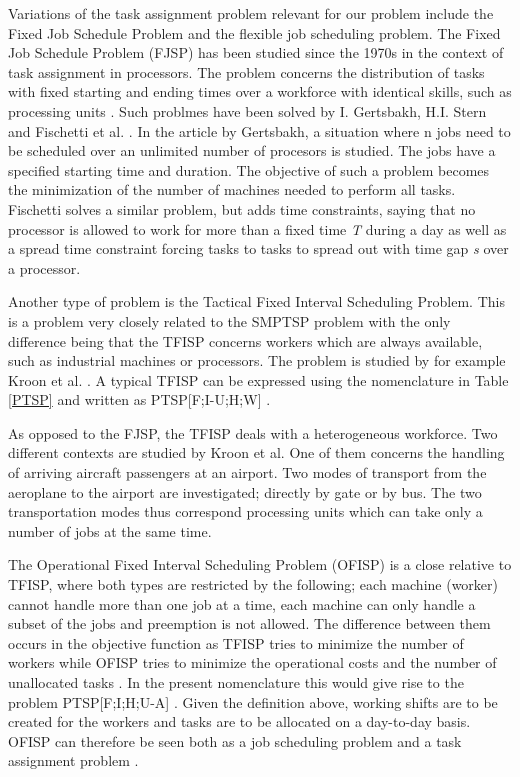 Variations of the task assignment problem relevant for our problem include the Fixed Job Schedule Problem and the flexible job scheduling problem. The Fixed Job Schedule Problem (FJSP) has been studied since the 1970s in the context of task assignment in processors. The problem concerns the distribution of tasks with fixed starting and ending times over a workforce with identical skills, such as processing units \cite{krishnamoorthy_2011}. Such problmes have been solved by I. Gertsbakh, H.I. Stern \cite{Gertsbakh_1977} and Fischetti et al. \cite{fischetti_1992}. In the article by Gertsbakh, a situation where n jobs need to be scheduled over an unlimited number of procesors is studied. The jobs have a specified starting time and duration. The objective of such a problem becomes the minimization of the number of machines needed to perform all tasks. Fischetti solves a similar problem, but adds time constraints, saying that no processor is allowed to work for more than a fixed time \textit{T} during a day as well as a spread time constraint forcing tasks to tasks to spread out with time gap \textit{s} over a processor.	

Another type of problem is the Tactical Fixed Interval Scheduling Problem. This is a problem very closely related to the SMPTSP problem with the only difference being that the TFISP concerns workers which are always available, such as industrial machines or processors. The problem is studied by for example Kroon et al. \cite{kroon_1997}. A typical TFISP can be expressed using the nomenclature in Table \ref{PTSP} and written as PTSP[F;I-U;H;W] \cite{krishnamoorthy_2001}.

As opposed to the FJSP, the TFISP deals with a heterogeneous workforce. Two different contexts are studied by Kroon et al. One of them concerns the handling of arriving aircraft passengers at an airport. Two modes of transport from the aeroplane to the airport are investigated; directly by gate or by bus. The two transportation modes thus correspond processing units which can take only a number of jobs at the same time.

The Operational Fixed Interval Scheduling Problem (OFISP) is a close relative to TFISP, where both types are restricted by the following; each machine (worker) cannot handle more than one job at a time, each machine can only handle a subset of the jobs and preemption is not allowed. The difference between them occurs in the objective function as TFISP tries to minimize the number of workers while OFISP tries to minimize the operational costs and the number of unallocated tasks \cite{kroon_1993}. In the present nomenclature this would give rise to the problem PTSP[F;I;H;U-A] \cite{krishnamoorthy_2001}. Given the definition above, working shifts are to be created for the workers and tasks are to be allocated on a day-to-day basis. OFISP can therefore be seen both as a job scheduling problem and a task assignment problem \cite{kroon_1993}.



